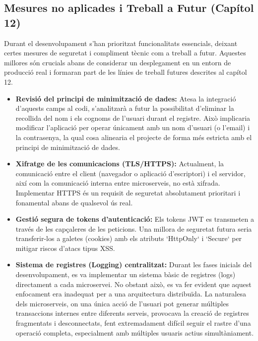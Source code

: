 \subsection{Mesures no aplicades i Treball a Futur (Capítol 12)}

Durant el desenvolupament s'han prioritzat funcionalitats essencials, deixant certes mesures de seguretat i compliment tècnic com a treball a futur. Aquestes millores són crucials abans de considerar un desplegament en un entorn de producció real i formaran part de les línies de treball futures descrites al capítol 12.

\begin{itemize}
    \item \textbf{Revisió del principi de minimització de dades:} Atesa la integració d'aquests camps al codi, s'analitzarà a futur la possibilitat d'eliminar la recollida del nom i els cognoms de l'usuari durant el registre. Això implicaria modificar l'aplicació per operar únicament amb un nom d'usuari (o l'email) i la contrasenya, la qual cosa alinearia el projecte de forma més estricta amb el principi de minimització de dades.

    \item \textbf{Xifratge de les comunicacions (TLS/HTTPS):} Actualment, la comunicació entre el client (navegador o aplicació d'escriptori) i el servidor, així com la comunicació interna entre microserveis, no està xifrada. Implementar HTTPS és un requisit de seguretat absolutament prioritari i fonamental abans de qualsevol ús real.

    \item \textbf{Gestió segura de tokens d'autenticació:} Els tokens JWT es transmeten a través de les capçaleres de les peticions. Una millora de seguretat futura seria transferir-los a galetes (cookies) amb els atributs `HttpOnly` i `Secure` per mitigar riscos d'atacs tipus XSS.

    \item \textbf{Sistema de registres (Logging) centralitzat:} Durant les fases inicials del desenvolupament, es va implementar un sistema bàsic de registres (logs) directament a cada microservei. No obstant això, es va fer evident que aquest enfocament era inadequat per a una arquitectura distribuïda. La naturalesa dels microserveis, on una única acció de l'usuari pot generar múltiples transaccions internes entre diferents serveis, provocava la creació de registres fragmentats i desconnectats, fent extremadament difícil seguir el rastre d'una operació completa, especialment amb múltiples usuaris actius simultàniament.


\end{itemize}
